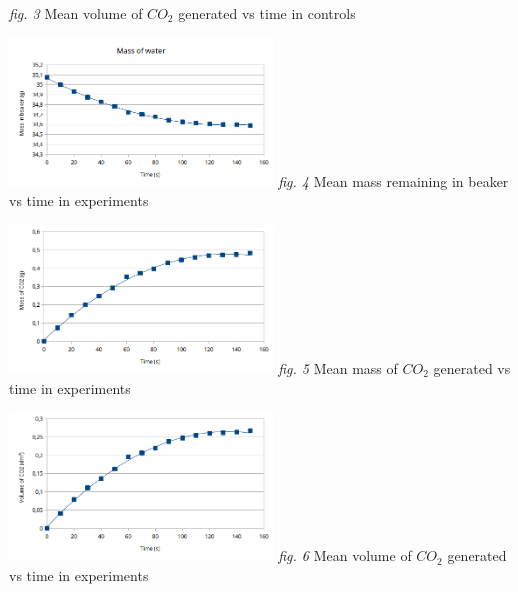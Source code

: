\documentclass[twoside]{article}
\newcommand{\gw}{7cm}
\begin{document}
\begin{multicols}{2}
\begin{center}
			\emph{fig. 3} Mean volume of $CO_2$ generated vs time in controls
		\end{center}
		\begin{center}
			\includegraphics[width=\gw]{exp mass_b-time.png}
			\emph{fig. 4} Mean mass remaining in beaker vs time in experiments
		\end{center}
		\begin{center}
			\includegraphics[width=\gw]{exp mass_co2-time.png}
			\emph{fig. 5} Mean mass of $CO_2$ generated vs time in experiments
		\end{center}
		\begin{center}
			\includegraphics[width=\gw]{exp vol-time.png}
			\emph{fig. 6} Mean volume of $CO_2$ generated vs time in experiments
		\end{center}
	\end{multicols}
	\newpage
\end{document}
